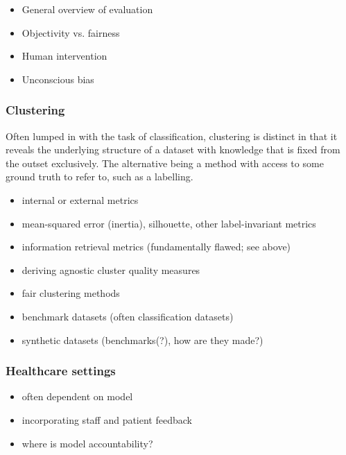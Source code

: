 \begin{itemize}
    \item General overview of evaluation
    \item Objectivity vs. fairness
    \item Human intervention
    \item Unconscious bias
\end{itemize}

\subsubsection{Clustering}

Often lumped in with the task of
classification, clustering is distinct in that it reveals the underlying
structure of a dataset with knowledge that is fixed from the outset exclusively.
The alternative being a method with access to some ground truth to refer to,
such as a labelling.

\begin{itemize}
    \item internal or external metrics
    \item mean-squared error (inertia), silhouette, other label-invariant
        metrics
    \item information retrieval metrics (fundamentally flawed; see above)
    \item deriving agnostic cluster quality measures
    \item fair clustering methods
    \item benchmark datasets (often classification datasets)
    \item synthetic datasets (benchmarks(?), how are they made?)
\end{itemize}

\subsubsection{Healthcare settings}

\begin{itemize}
    \item often dependent on model
    \item incorporating staff and patient feedback
    \item where is model accountability?
\end{itemize}
